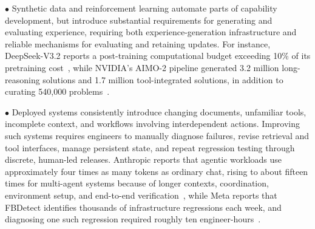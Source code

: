 

\noindent$\bullet$  Synthetic data and reinforcement learning automate parts of capability development, but introduce substantial requirements for generating and evaluating experience, requiring both experience-generation infrastructure and reliable mechanisms for evaluating and retaining updates. For instance, DeepSeek-V3.2 reports a post-training computational budget exceeding 10\% of its pretraining cost~\cite{deepseekai2025deepseekv32pushingfrontieropen}, while NVIDIA's AIMO-2 pipeline generated 3.2 million long-reasoning solutions and 1.7 million tool-integrated solutions, in addition to curating 540,000 problems~\cite{nvidia2025aimo}.





\noindent$\bullet$  Deployed systems consistently introduce changing documents, unfamiliar tools, incomplete context, and workflows involving interdependent actions. Improving such systems requires engineers to manually diagnose failures, revise retrieval and tool interfaces, manage persistent state, and repeat regression testing through discrete, human-led releases. Anthropic reports that agentic workloads use approximately four times as many tokens as ordinary chat, rising to about fifteen times for multi-agent systems because of longer contexts, coordination, environment setup, and end-to-end verification~\cite{anthropic2025research}, while Meta reports that FBDetect identifies thousands of infrastructure regressions each week, and diagnosing one such regression required roughly ten engineer-hours~\cite{meta_capacity_efficiency_2026}.

